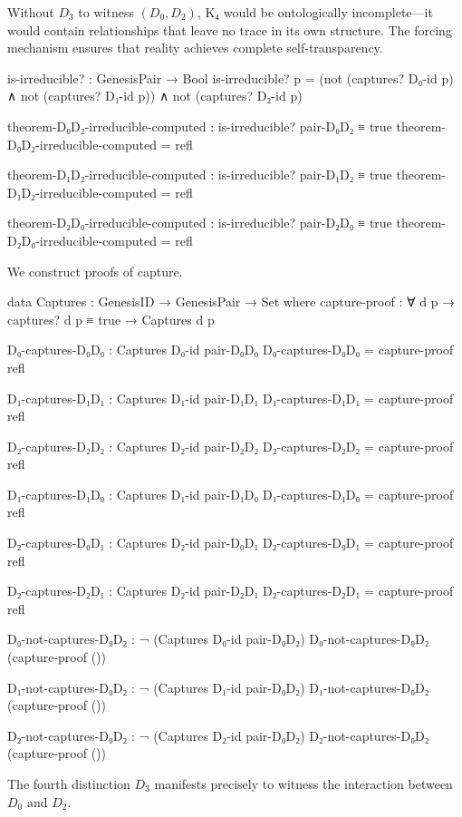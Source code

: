 \documentclass[11pt,a4paper]{book}
\begin{document}
Without $D_3$ to witness $(D_0, D_2)$, K₄ would be ontologically incomplete—it would contain relationships that leave no trace in its own structure. The forcing mechanism ensures that reality achieves complete self-transparency.

\begin{code}
is-irreducible? : GenesisPair → Bool
is-irreducible? p = (not (captures? D₀-id p) ∧ not (captures? D₁-id p)) ∧ not (captures? D₂-id p)

theorem-D₀D₂-irreducible-computed : is-irreducible? pair-D₀D₂ ≡ true
theorem-D₀D₂-irreducible-computed = refl

theorem-D₁D₂-irreducible-computed : is-irreducible? pair-D₁D₂ ≡ true
theorem-D₁D₂-irreducible-computed = refl

theorem-D₂D₀-irreducible-computed : is-irreducible? pair-D₂D₀ ≡ true
theorem-D₂D₀-irreducible-computed = refl
\end{code}

We construct proofs of capture.

\begin{code}
data Captures : GenesisID → GenesisPair → Set where
  capture-proof : ∀ {d p} → captures? d p ≡ true → Captures d p

D₀-captures-D₀D₀ : Captures D₀-id pair-D₀D₀
D₀-captures-D₀D₀ = capture-proof refl

D₁-captures-D₁D₁ : Captures D₁-id pair-D₁D₁
D₁-captures-D₁D₁ = capture-proof refl

D₂-captures-D₂D₂ : Captures D₂-id pair-D₂D₂
D₂-captures-D₂D₂ = capture-proof refl

D₁-captures-D₁D₀ : Captures D₁-id pair-D₁D₀
D₁-captures-D₁D₀ = capture-proof refl

D₂-captures-D₀D₁ : Captures D₂-id pair-D₀D₁
D₂-captures-D₀D₁ = capture-proof refl

D₂-captures-D₂D₁ : Captures D₂-id pair-D₂D₁
D₂-captures-D₂D₁ = capture-proof refl

D₀-not-captures-D₀D₂ : ¬ (Captures D₀-id pair-D₀D₂)
D₀-not-captures-D₀D₂ (capture-proof ())

D₁-not-captures-D₀D₂ : ¬ (Captures D₁-id pair-D₀D₂)
D₁-not-captures-D₀D₂ (capture-proof ())

D₂-not-captures-D₀D₂ : ¬ (Captures D₂-id pair-D₀D₂)
D₂-not-captures-D₀D₂ (capture-proof ())

\end{code}

The fourth distinction $D_3$ manifests precisely to witness the interaction between $D_0$ and $D_2$.
\end{document}
